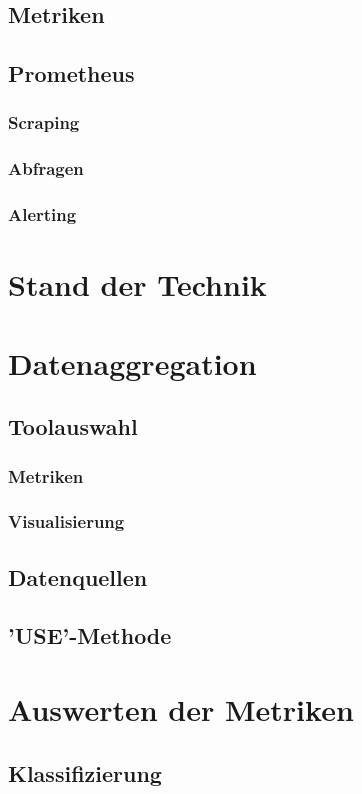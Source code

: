 \documentclass[a4paper,12pt]{scrartcl}
\begin{document}
\subsection{Metriken}
\subsection{Prometheus}
\subsubsection{Scraping}
\subsubsection{Abfragen}
\subsubsection{Alerting}

\section{Stand der Technik}

\section{Datenaggregation}
\subsection{Toolauswahl}
\subsubsection{Metriken}
\subsubsection{Visualisierung}
\subsection{Datenquellen}
\subsection{'USE'-Methode}

\section{Auswerten der Metriken}
\subsection{Klassifizierung}
\end{document}

